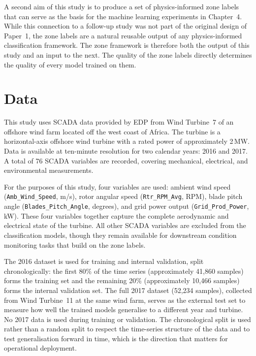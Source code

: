 A second aim of this study is to produce a set of physics-informed zone labels that can
serve as the basis for the machine learning experiments in Chapter~4. While this
connection to a follow-up study was not part of the original design of Paper~1, the
zone labels are a natural reusable output of any physics-informed classification
framework. The zone framework
is therefore both the output of this study and an input to the next. The quality of the
zone labels directly determines the quality of every model trained on them.

\section{Data}
\label{sec:ch3:data}

This study uses SCADA data provided by EDP from Wind Turbine~7 of an offshore wind farm
located off the west coast of Africa. The turbine is a horizontal-axis offshore wind
turbine with a rated power of approximately 2\,MW. Data is available at ten-minute
resolution for two calendar years: 2016 and 2017. A total of 76 SCADA variables are
recorded, covering mechanical, electrical, and environmental measurements.

For the purposes of this study, four variables are used: ambient wind speed
(\texttt{Amb\_Wind\_Speed}, m/s), rotor angular speed (\texttt{Rtr\_RPM\_Avg}, RPM),
blade pitch angle (\texttt{Blades\_Pitch\_Angle}, degrees), and grid power output
(\texttt{Grid\_Prod\_Power}, kW). These four variables together capture the complete
aerodynamic and electrical state of the turbine. All other SCADA variables are excluded
from the classification models, though they remain available for downstream condition
monitoring tasks that build on the zone labels.

The 2016 dataset is used for training and internal validation, split chronologically:
the first 80\% of the time series (approximately 41,860 samples) forms the training set
and the remaining 20\% (approximately 10,466 samples) forms the internal validation set.
The full 2017 dataset (52,234 samples), collected from Wind Turbine~11 at the same wind
farm, serves as the external test set to measure how well the trained models generalise
to a different year and turbine. No 2017 data is used during training or validation. The
chronological split is used rather than a random split to respect the time-series
structure of the data and to test generalisation forward in time, which is the direction
that matters for operational deployment.

